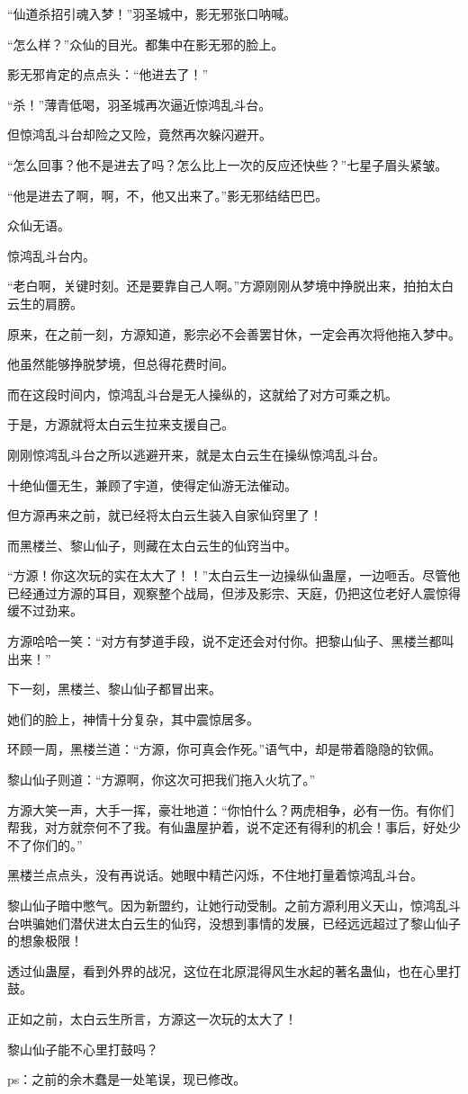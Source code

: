 \begin{this_body}
“仙道杀招引魂入梦！”羽圣城中，影无邪张口呐喊。

“怎么样？”众仙的目光。都集中在影无邪的脸上。

影无邪肯定的点点头：“他进去了！”

“杀！”薄青低喝，羽圣城再次逼近惊鸿乱斗台。

但惊鸿乱斗台却险之又险，竟然再次躲闪避开。

“怎么回事？他不是进去了吗？怎么比上一次的反应还快些？”七星子眉头紧皱。

“他是进去了啊，啊，不，他又出来了。”影无邪结结巴巴。

众仙无语。

惊鸿乱斗台内。

“老白啊，关键时刻。还是要靠自己人啊。”方源刚刚从梦境中挣脱出来，拍拍太白云生的肩膀。

原来，在之前一刻，方源知道，影宗必不会善罢甘休，一定会再次将他拖入梦中。

他虽然能够挣脱梦境，但总得花费时间。

而在这段时间内，惊鸿乱斗台是无人操纵的，这就给了对方可乘之机。

于是，方源就将太白云生拉来支援自己。

刚刚惊鸿乱斗台之所以逃避开来，就是太白云生在操纵惊鸿乱斗台。

十绝仙僵无生，兼顾了宇道，使得定仙游无法催动。

但方源再来之前，就已经将太白云生装入自家仙窍里了！

而黑楼兰、黎山仙子，则藏在太白云生的仙窍当中。

“方源！你这次玩的实在太大了！！”太白云生一边操纵仙蛊屋，一边咂舌。尽管他已经通过方源的耳目，观察整个战局，但涉及影宗、天庭，仍把这位老好人震惊得缓不过劲来。

方源哈哈一笑：“对方有梦道手段，说不定还会对付你。把黎山仙子、黑楼兰都叫出来！”

下一刻，黑楼兰、黎山仙子都冒出来。

她们的脸上，神情十分复杂，其中震惊居多。

环顾一周，黑楼兰道：“方源，你可真会作死。”语气中，却是带着隐隐的钦佩。

黎山仙子则道：“方源啊，你这次可把我们拖入火坑了。”

方源大笑一声，大手一挥，豪壮地道：“你怕什么？两虎相争，必有一伤。有你们帮我，对方就奈何不了我。有仙蛊屋护着，说不定还有得利的机会！事后，好处少不了你们的。”

黑楼兰点点头，没有再说话。她眼中精芒闪烁，不住地打量着惊鸿乱斗台。

黎山仙子暗中憋气。因为新盟约，让她行动受制。之前方源利用义天山，惊鸿乱斗台哄骗她们潜伏进太白云生的仙窍，没想到事情的发展，已经远远超过了黎山仙子的想象极限！

透过仙蛊屋，看到外界的战况，这位在北原混得风生水起的著名蛊仙，也在心里打鼓。

正如之前，太白云生所言，方源这一次玩的太大了！

黎山仙子能不心里打鼓吗？

ps：之前的余木蠢是一处笔误，现已修改。

\end{this_body}

